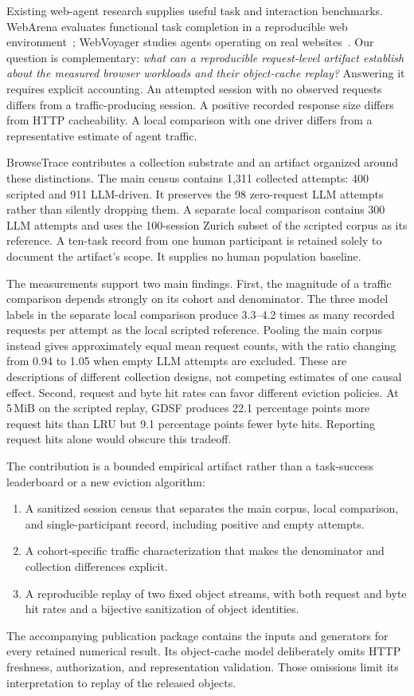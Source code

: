 \documentclass[10pt,sigconf,nonacm]{acmart}
\newcommand{\sysname}{BrowseTrace\xspace}
\newcommand{\mib}{\,MiB\xspace}
\begin{document}
Existing web-agent research supplies useful task and interaction benchmarks. WebArena evaluates functional task completion in a reproducible web environment~\cite{webarena}; WebVoyager studies agents operating on real websites~\cite{webvoyager}. Our question is complementary: \emph{what can a reproducible request-level artifact establish about the measured browser workloads and their object-cache replay?} Answering it requires explicit accounting. An attempted session with no observed requests differs from a traffic-producing session. A positive recorded response size differs from HTTP cacheability. A local comparison with one driver differs from a representative estimate of agent traffic.

\sysname contributes a collection substrate and an artifact organized around these distinctions. The main census contains 1{,}311 collected attempts: 400 scripted and 911 LLM-driven. It preserves the 98 zero-request LLM attempts rather than silently dropping them. A separate local comparison contains 300 LLM attempts and uses the 100-session Zurich subset of the scripted corpus as its reference. A ten-task record from one human participant is retained solely to document the artifact's scope. It supplies no human population baseline.

The measurements support two main findings. First, the magnitude of a traffic comparison depends strongly on its cohort and denominator. The three model labels in the separate local comparison produce 3.3--4.2 times as many recorded requests per attempt as the local scripted reference. Pooling the main corpus instead gives approximately equal mean request counts, with the ratio changing from 0.94 to 1.05 when empty LLM attempts are excluded. These are descriptions of different collection designs, not competing estimates of one causal effect. Second, request and byte hit rates can favor different eviction policies. At 5\mib on the scripted replay, GDSF produces 22.1 percentage points more request hits than LRU but 9.1 percentage points fewer byte hits. Reporting request hits alone would obscure this tradeoff.

The contribution is a bounded empirical artifact rather than a task-success leaderboard or a new eviction algorithm:
\begin{enumerate}
\item A sanitized session census that separates the main corpus, local comparison, and single-participant record, including positive and empty attempts.
\item A cohort-specific traffic characterization that makes the denominator and collection differences explicit.
\item A reproducible replay of two fixed object streams, with both request and byte hit rates and a bijective sanitization of object identities.
\end{enumerate}
The accompanying publication package contains the inputs and generators for every retained numerical result. Its object-cache model deliberately omits HTTP freshness, authorization, and representation validation. Those omissions limit its interpretation to replay of the released objects.
\end{document}
